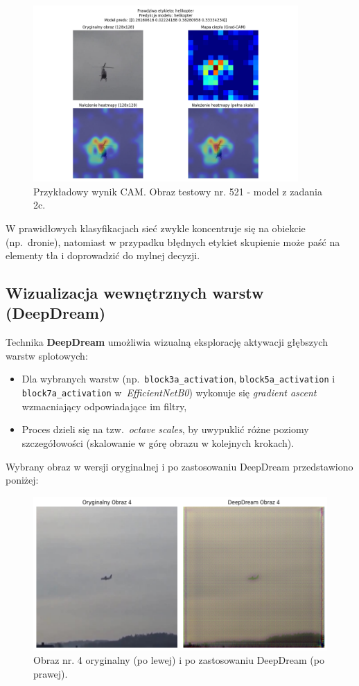 \begin{figure}[H]
    \centering
    \includegraphics[width=0.9\textwidth]{img/zad3/modelzad2c_heatmap_521_true_helikopter_pred_helikopter.png}
    \caption{Przykładowy wynik CAM. Obraz testowy nr. 521 - model z zadania 2c.}
    \label{fig:z3_cam}
\end{figure}
W prawidłowych klasyfikacjach sieć zwykle koncentruje się na obiekcie (np.\ dronie), natomiast w przypadku błędnych etykiet skupienie może paść na elementy tła i doprowadzić do mylnej decyzji.


\subsection{Wizualizacja wewnętrznych warstw (DeepDream)}
Technika \textbf{DeepDream} umożliwia wizualną eksplorację aktywacji głębszych warstw splotowych:
\begin{itemize}
    \item Dla wybranych warstw (np.\ \texttt{block3a\_activation}, \texttt{block5a\_activation} i \texttt{block7a\_activation} w~\emph{EfficientNetB0}) wykonuje się \emph{gradient ascent} wzmacniający odpowiadające im filtry,
    \item Proces dzieli się na tzw.\ \emph{octave scales}, by uwypuklić różne poziomy szczegółowości (skalowanie w górę obrazu w kolejnych krokach).
\end{itemize}

Wybrany obraz w wersji oryginalnej i po zastosowaniu DeepDream przedstawiono poniżej:
\begin{figure}[H]
    \centering
    \includegraphics[width=1\textwidth]{img/zad3/deepdream_oryginal.png}
    \caption{Obraz nr. 4 oryginalny (po lewej) i po zastosowaniu DeepDream (po prawej).}
    \label{fig:z3_deepdream}
\end{figure}


